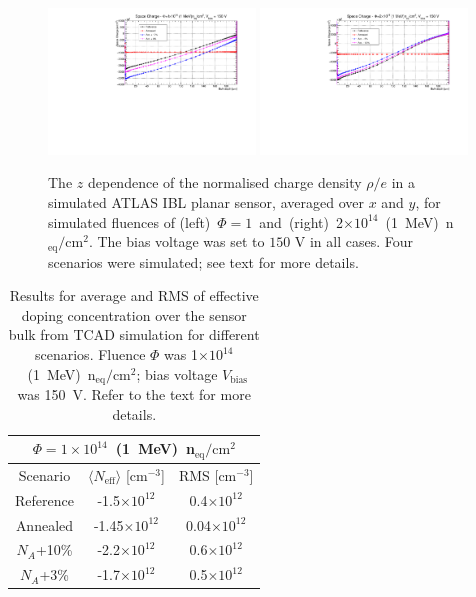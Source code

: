 \begin{figure}[!htpb]
\centering
\includegraphics[width=0.49\textwidth]{TCAD_SpaceCharge_variations_1e14_150V.pdf}
\includegraphics[width=0.49\textwidth]{TCAD_SpaceCharge_variations_2e14_150V.pdf}
\caption{\label{fig:NeffTCADAnnealing}The $z$ dependence of the normalised charge density $\rho/e$ in a simulated ATLAS IBL planar sensor, averaged over $x$ and $y$, for  simulated
  fluences of (left)~$\Phi=1$~and~(right)~2$\times10^{14}$~(1~MeV)~n$_\text{eq}/\text{cm}^{2}$. The bias voltage was set to $150$ V in all cases. Four scenarios were simulated; see text for more 
  details.}
\end{figure}


\begin{table}[htbp]
   \centering
   \begin{tabular}{|c|c|c|} 
      \hline
            \multicolumn{3}{|c|}{$\Phi=1\times10^{14}$~(1~MeV)~n$_\text{eq}/\text{cm}^{2}$  } \\
      \hline 
        Scenario  & $\langle N_\text{eff}\rangle$ [cm$^{-3}$] & RMS [cm$^{-3}$] \\
      \hline
       Reference &  -1.5$\times10^{12}$ & 0.4$\times10^{12}$  \\
 Annealed   & -1.45$\times10^{12}$ & 0.04$\times10^{12}$ \\
 $N_A$+10\% &  -2.2$\times10^{12}$ & 0.6$\times10^{12}$  \\
 $N_A$+3\% &  -1.7$\times10^{12}$ & 0.5$\times10^{12}$  \\
      \hline
         \end{tabular}
   \caption{\label{tab:TCADNeffHamburg1}Results for average and RMS of effective doping concentration over the sensor bulk from TCAD simulation for different scenarios. 
Fluence $\Phi$ was 1$\times10^{14}$~(1~MeV)~n$_\text{eq}/\text{cm}^{2}$; bias voltage $V_\text{bias}$ 
was 150~V.  Refer to the text for more details.}
\end{table}




